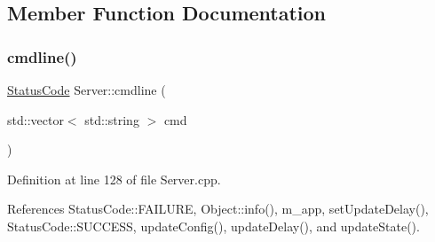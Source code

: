 \subsection{Member Function Documentation}
\mbox{\label{classServer_adc7d38a333b12fbe03db3d209f5feae9}} 
\subsubsection{\texorpdfstring{cmdline()}{cmdline()}}
{\footnotesize\ttfamily \hyperlink{classStatusCode}{Status\+Code} Server\+::cmdline (\begin{DoxyParamCaption}\item[{std\+::vector$<$ std\+::string $>$}]{cmd }\end{DoxyParamCaption})}



Definition at line 128 of file Server.\+cpp.



References Status\+Code\+::\+F\+A\+I\+L\+U\+RE, Object\+::info(), m\+\_\+app, set\+Update\+Delay(), Status\+Code\+::\+S\+U\+C\+C\+E\+SS, update\+Config(), update\+Delay(), and update\+State().


